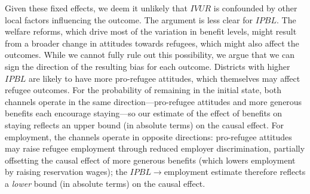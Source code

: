 Given these fixed effects, we deem it unlikely that $IVUR$ is confounded by other local factors influencing the outcome. The argument is less clear for $IPBL$. The welfare reforms, which drive most of the variation in benefit levels, might result from a broader change in attitudes towards refugees, which might also affect the outcomes. While we cannot fully rule out this possibility, we argue that we can sign the direction of the resulting bias for each outcome. Districts with higher $IPBL$ are likely to have more pro-refugee attitudes, which themselves may affect refugee outcomes. For the probability of remaining in the initial state, both channels operate in the same direction---pro-refugee attitudes and more generous benefits each encourage staying---so our estimate of the effect of benefits on staying reflects an upper bound (in absolute terms) on the causal effect. For employment, the channels operate in opposite directions: pro-refugee attitudes may raise refugee employment through reduced employer discrimination, partially offsetting the causal effect of more generous benefits (which lowers employment by raising reservation wages); the $IPBL\to$employment estimate therefore reflects a \emph{lower} bound (in absolute terms) on the causal effect.  %
